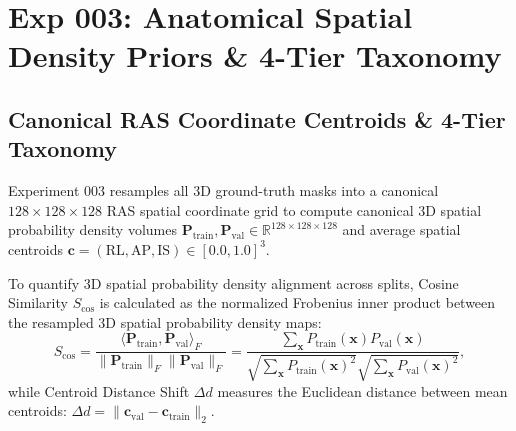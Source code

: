 \documentclass[11pt,a4paper]{article}
\begin{document}
\section{Exp 003: Anatomical Spatial Density Priors \& 4-Tier Taxonomy}

\subsection{Canonical RAS Coordinate Centroids \& 4-Tier Taxonomy}
Experiment 003 resamples all 3D ground-truth masks into a canonical $128 \times 128 \times 128$ RAS spatial coordinate grid to compute canonical 3D spatial probability density volumes $\mathbf{P}_{\text{train}}, \mathbf{P}_{\text{val}} \in \mathbb{R}^{128 \times 128 \times 128}$ and average spatial centroids $\mathbf{c} = (\text{RL}, \text{AP}, \text{IS}) \in [0.0, 1.0]^3$. 

To quantify 3D spatial probability density alignment across splits, Cosine Similarity $S_{\text{cos}}$ is calculated as the normalized Frobenius inner product between the resampled 3D spatial probability density maps:
\begin{equation}
S_{\text{cos}} = \frac{\langle \mathbf{P}_{\text{train}}, \mathbf{P}_{\text{val}} \rangle_F}{\|\mathbf{P}_{\text{train}}\|_F \|\mathbf{P}_{\text{val}}\|_F} = \frac{\sum_{\mathbf{x}} P_{\text{train}}(\mathbf{x}) P_{\text{val}}(\mathbf{x})}{\sqrt{\sum_{\mathbf{x}} P_{\text{train}}(\mathbf{x})^2} \sqrt{\sum_{\mathbf{x}} P_{\text{val}}(\mathbf{x})^2}},
\end{equation}
while Centroid Distance Shift $\Delta d$ measures the Euclidean distance between mean centroids: $\Delta d = \|\mathbf{c}_{\text{val}} - \mathbf{c}_{\text{train}}\|_2$.
\end{document}
